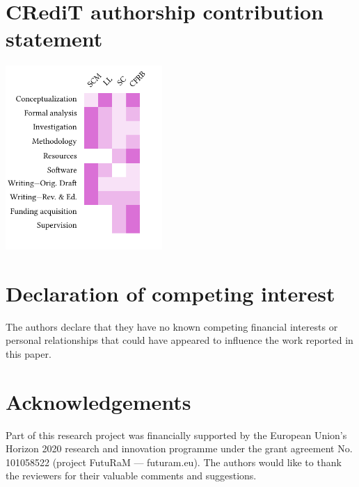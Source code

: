\documentclass[review,3p,authoryear]{elsarticle}
\newcommand{\cbox}[1]{
    \begin{tcolorbox}[hbox, colback=red!5!white, colframe=red!65!black, boxrule=0.25pt, boxsep=2pt, left=2pt, right=2pt, top=1pt, bottom=1pt]
        \small\sffamily #1
    \end{tcolorbox}
}
\begin{document}

\section*{CRediT authorship contribution statement}

\includegraphics[width=\columnwidth, height=7cm, keepaspectratio]{credit.pdf}

\section*{Declaration of competing interest}
The authors declare that they have no known competing financial interests or personal relationships that could have appeared to influence the work reported in this paper.

\section*{Acknowledgements}
    Part of this research project was financially supported by the European Union's Horizon 2020 research and innovation programme under the grant agreement No. 101058522 (project FutuRaM --- futuram.eu). The authors would like to thank the reviewers for their valuable comments and suggestions.
\end{document}
